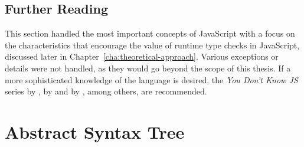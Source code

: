 %

\subsection{Further Reading}
\label{sec:further reading}

This section handled the most important concepts of JavaScript with a focus on the characteristics that encourage the value of runtime type checks in JavaScript, discussed later in Chapter~\ref{cha:theoretical-approach}. Various exceptions or details were not handled, as they would go beyond the scope of this thesis. If a more sophisticated knowledge of the language is desired, the \emph{You Don't Know JS} series by \citeauthor{YDKJS:UpAndGoing:Simpson:2015}, \emph{\emph{}} by \citeauthor{JavaScriptTheGoodParts:Crockford:2008} and \emph{\emph{}} by \citeauthor{JavaScriptTheDefinitiveGuide:Flanagan:2011}, among others, are recommended.

\section{Abstract Syntax Tree}
\label{sec:ast}

